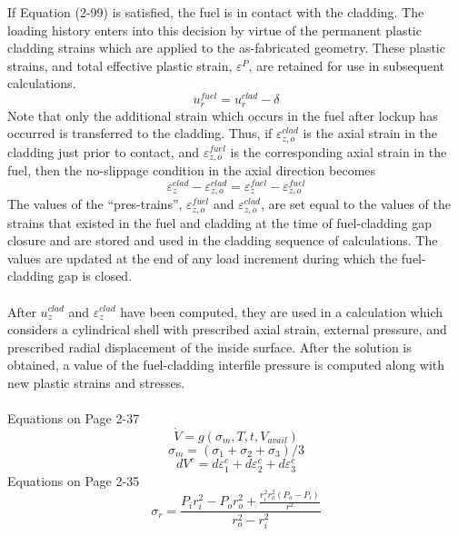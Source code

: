 \documentclass[12pt]{article}
\begin{document}
If Equation (2-99) is satisfied, the fuel is in contact with the cladding. The loading history enters into this decision by virtue of the permanent plastic cladding strains which are applied to the as-fabricated geometry. These plastic strains, and total effective plastic strain, $\varepsilon^P$, are retained for use in subsequent calculations. 
\begin{equation}
u_r^{fuel} = u_r^{clad}-\delta
\end{equation}
Note that only the additional strain which occurs in the fuel after lockup has occurred is transferred to the cladding. Thus, if $\varepsilon_{z,o}^{clad}$ is the axial strain in the cladding just prior to contact, and $\varepsilon_{z,o}^{fuel}$ is the corresponding axial strain in the fuel, then the no-slippage condition in the axial direction becomes
\begin{equation}
\varepsilon_{z}^{clad}-\varepsilon_{z,o}^{clad}=\varepsilon_{z}^{fuel}-\varepsilon_{z,o}^{fuel}
\end{equation}
The values of the “pres-trains”, $\varepsilon_{z,o}^{fuel}$ and $\varepsilon_{z,o}^{clad}$, are set equal to the values of the strains that existed in the fuel and cladding at the time of fuel-cladding gap closure and are stored and used in the cladding sequence of calculations. The values are updated at the end of any load increment during which the fuel-cladding gap is closed.\\
\\
After $u_{z}^{clad}$ and $\varepsilon_{z}^{clad}$  have been computed, they are used in a calculation which considers a cylindrical shell with prescribed axial strain, external pressure, and prescribed radial displacement of the inside surface. After the solution is obtained, a value of the fuel-cladding interfile pressure is computed along with new plastic strains and stresses.\\
\\
Equations on Page 2-37
\begin{equation}
\dot{V}=g \left( \sigma_{m},T,t,V_{avail} \right)
\end{equation}
\begin{equation}
\sigma_m = \left(\sigma_1+\sigma_2+\sigma_3 \right)/3
\end{equation}
\begin{equation}
dV^c=d\varepsilon_1^c+d\varepsilon_2^c+d\varepsilon_3^c
\end{equation}
Equations on Page 2-35
\begin{equation}
\sigma_r=\frac{P_{i}r_{i}^2-P_{o}r_{o}^2+\frac{r_{i}^2 r_{o}^2 \left( P_{o}-P_{i} \right)}{r^2}}{r_{o}^2-r_{i}^2}
\end{equation}
\end{document}
